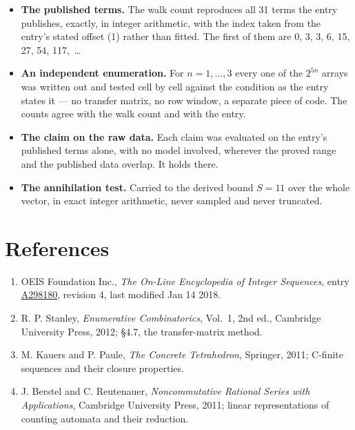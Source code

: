 \documentclass[11pt]{article}
\theoremstyle{definition}
\begin{document}
\begin{itemize}

\item {\bfseries The published terms.} The walk count reproduces all 31 terms the entry publishes, exactly, in integer arithmetic, with the index taken from the entry's stated offset (1) rather than fitted. The first of them are 0, 3, 3, 6, 15, 27, 54, 117,~\dots

\item {\bfseries An independent enumeration.} For $n = 1,\dots,3$ every one of the $2^{5n}$ arrays was written out and tested cell by cell against the condition as the entry states it --- no transfer matrix, no row window, a separate piece of code. The counts agree with the walk count and with the entry.

\item {\bfseries The claim on the raw data.} Each claim was evaluated on the entry's published terms alone, with no model involved, wherever the proved range and the published data overlap. It holds there.

\item {\bfseries The annihilation test.} Carried to the derived bound $S = 11$ over the whole vector, in exact integer arithmetic, never sampled and never truncated.

\end{itemize}

\section{References}

\begin{enumerate}

\item OEIS Foundation Inc., \emph{The On-Line Encyclopedia of Integer Sequences}, entry \href{https://oeis.org/A298180}{A298180}, revision 4, last modified Jan 14 2018.

\item R. P. Stanley, \emph{Enumerative Combinatorics}, Vol.~1, 2nd ed., Cambridge University Press, 2012; \S4.7, the transfer-matrix method.

\item M. Kauers and P. Paule, \emph{The Concrete Tetrahedron}, Springer, 2011; C-finite sequences and their closure properties.

\item J. Berstel and C. Reutenauer, \emph{Noncommutative Rational Series with Applications}, Cambridge University Press, 2011; linear representations of counting automata and their reduction.

\end{enumerate}
\end{document}
